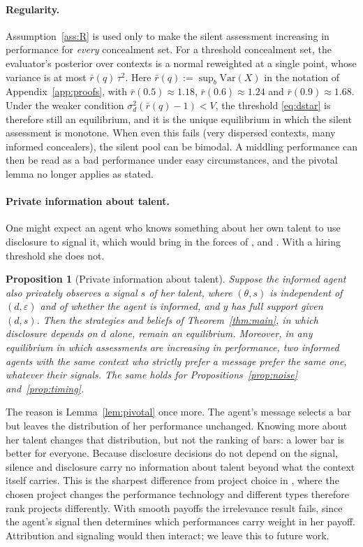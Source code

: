 \documentclass[11pt]{article}
\newtheorem{proposition}{Proposition}
\theoremstyle{definition}
\newcommand{\Var}{\mathrm{Var}}
\newcommand{\sd}{\sigma_d}
\begin{document}
\paragraph{Regularity.} Assumption~\ref{ass:R} is used only to make the silent assessment increasing in performance for \emph{every} concealment set. For a threshold concealment set, the evaluator's posterior over contexts is a normal reweighted at a single point, whose variance is at most $\bar r(q)\,\tau^2$. Here $\bar r(q):=\sup_b\Var(X)$ in the notation of Appendix~\ref{app:proofs}, with $\bar r(0.5)\approx1.18$, $\bar r(0.6)\approx1.24$ and $\bar r(0.9)\approx1.68$. Under the weaker condition $\sd^2(\bar r(q)-1)<V$, the threshold \eqref{eq:dstar} is therefore still an equilibrium, and it is the unique equilibrium in which the silent assessment is monotone. When even this fails (very dispersed contexts, many informed concealers), the silent pool can be bimodal. A middling performance can then be read as a bad performance under easy circumstances, and the pivotal lemma no longer applies as stated.

\paragraph{Private information about talent.} One might expect an agent who knows something about her own talent to use disclosure to signal it, which would bring in the forces of \citet{Zwiebel1995}, \citet{FeltovichHarbaughTo2002} and \citet{HarbaughTo2020}. With a hiring threshold she does not.

\begin{proposition}[Private information about talent]\label{prop:private}
Suppose the informed agent also privately observes a signal $s$ of her talent, where $(\theta,s)$ is independent of $(d,\varepsilon)$ and of whether the agent is informed, and $y$ has full support given $(d,s)$. Then the strategies and beliefs of Theorem~\ref{thm:main}, in which disclosure depends on $d$ alone, remain an equilibrium. Moreover, in any equilibrium in which assessments are increasing in performance, two informed agents with the same context who strictly prefer a message prefer the same one, whatever their signals. The same holds for Propositions~\ref{prop:noise} and~\ref{prop:timing}.
\end{proposition}

The reason is Lemma~\ref{lem:pivotal} once more. The agent's message selects a bar but leaves the distribution of her performance unchanged. Knowing more about her talent changes that distribution, but not the ranking of bars: a lower bar is better for everyone. Because disclosure decisions do not depend on the signal, silence and disclosure carry no information about talent beyond what the context itself carries. This is the sharpest difference from project choice in \citet{Zwiebel1995}, where the chosen project changes the performance technology and different types therefore rank projects differently. With smooth payoffs the irrelevance result fails, since the agent's signal then determines which performances carry weight in her payoff. Attribution and signaling would then interact; we leave this to future work.
\end{document}
